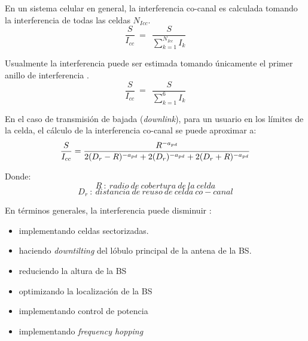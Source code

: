En un sistema celular en general, la interferencia co-canal es calculada tomando la interferencia de todas las celdas $N_{Icc}$.
\begin{equation}
\frac{S}{I_{cc}}\ =\ \ \frac{S}{\sum^{N_{Icc}}_{k=1}{I_k}} 
\label{eqn:Icc}
\end{equation}

Usualmente la interferencia puede ser estimada tomando únicamente el primer anillo de interferencia \parencite{Correia2018}.
\begin{equation}
\frac{S}{I_{cc}}\ =\ \ \frac{S}{\sum^6_{k=1}{I_k}} 
\label{eqn:I}
\end{equation}

En el caso de transmisión de bajada (\textit{downlink}), para un usuario en los límites de la celda, el cálculo de la interferencia co-canal se puede aproximar a:\newline
\begin{equation}
    \frac{S}{I_{cc}}=\frac{R^{-a_{pd}}}{ 2(D_{r}-R)^{-a_{pd}}+2(D_{r})^{-a_{pd}} + 2(D_{r}+R)^{-a_{pd}}}\\
    \label{eqn:SIcc}
\end{equation}

Donde:
\[R\ :\ radio\ de\ cobertura\ de\ la\ celda\] 
\[D_{r}\ :\ distancia\ de\ reuso\ de\ celda\ co-canal\] 

En términos generales, la interferencia puede disminuir \parencite{Correia2018}:
\begin{itemize}
    \item implementando celdas sectorizadas.
    \item haciendo \textit{downtilting} del lóbulo principal de la antena de la BS.
    \item reduciendo la altura de la BS
    \item optimizando la localización de la BS
    \item implementando control de potencia
    \item implementando \textit{frequency hopping }
\end{itemize}

